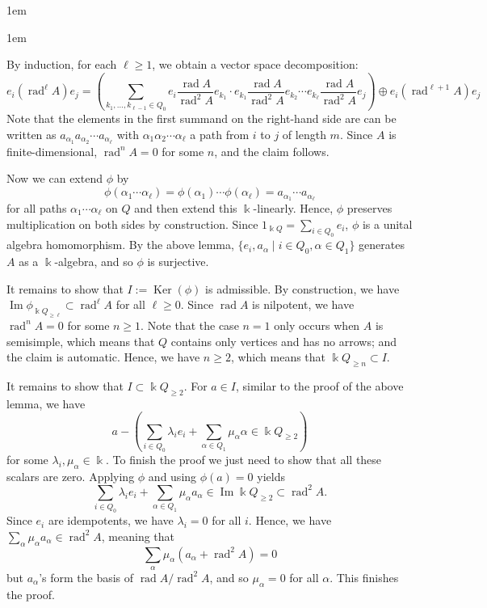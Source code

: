 \documentclass[11pt,a4paper]{article}
\makeatletter
\numberwithin{equation}{section}
\renewenvironment{proof}[1][\proofname]{\par
    \pushQED{\qed}%
    \normalfont \topsep0\p@\@plus6\p@ \labelsep1em\relax
    \trivlist
    \item[\hskip\labelsep\indent
        \bfseries #1]\ignorespaces
    \mbox{}
}{
    \popQED\endtrivlist\@endpefalse
}
\theoremstyle{all}
\theoremstyle{remark}
\newcommand{\rad}{\operatorname{rad}\nolimits}
\renewcommand{\Im}{\operatorname{Im}\nolimits}
\newcommand{\Ker}{\operatorname{Ker}\nolimits}
\makeatother
\begin{document}
\begin{proof}
\begin{proof}
By induction, for each $\ell \ge 1$, we obtain a vector space decomposition:
\[
e_i (\rad^{\ell} A) e_j = \left( \sum_{k_1,\ldots, k_{\ell-1}\in Q_0} e_i \frac{\rad A}{\rad^2 A} e_{k_1} \cdot e_{k_1} \frac{\rad A}{\rad^2 A} e_{k_2} \cdots e_{k_\ell} \frac{\rad A}{\rad^2 A} e_j \right) \oplus e_i (\rad^{\ell+1} A) e_j
\]
Note that the elements in the first summand on the right-hand side are can be written as $a_{\alpha_1}a_{\alpha_2}\cdots a_{\alpha_\ell}$ with $\alpha_1\alpha_2\cdots \alpha_\ell$ a path from $i$ to $j$ of length $m$.
Since $A$ is finite-dimensional, $\rad^n A=0$ for some $n$, and the claim follows.
\end{proof}

Now we can extend $\phi$ by \[
\phi(\alpha_1\cdots \alpha_\ell) = \phi(\alpha_1)\cdots \phi(\alpha_\ell) = a_{\alpha_1} \cdots a_{\alpha_\ell}
\]
for all paths $\alpha_1\cdots \alpha_\ell$ on $Q$ and then extend this $\Bbbk$-linearly.
Hence, $\phi$ preserves multiplication on both sides by construction.
Since $1_{\Bbbk Q} = \sum_{i\in Q_0} e_i$, $\phi$ is a unital algebra homomorphism.
By the above lemma, $\{ e_i, a_\alpha \mid i\in Q_0, \alpha\in Q_1\}$ generates $A$ as a $\Bbbk$-algebra, and so $\phi$ is surjective.

It remains to show that $I:=\Ker(\phi)$ is admissible.
By construction, we have $\Im\phi_{\Bbbk Q_{\ge\ell}}\subset \rad^\ell A$ for all $\ell\ge 0$.
Since $\rad A$ is nilpotent, we have $\rad^n A=0$ for some $n\ge 1$.  Note that the case $n=1$ only occurs when $A$ is semisimple, which means that $Q$ contains only vertices and has no arrows; and the claim is automatic.
Hence, we have $n\ge 2$, which means that $\Bbbk Q_{\ge n}\subset I$.

It remains to show that $I\subset \Bbbk Q_{\ge 2}$.
For $a\in I$, similar to the proof of the above lemma, we have
\[
a-\left( \sum_{i\in Q_0} \lambda_i e_i + \sum_{\alpha\in Q_1} \mu_\alpha \alpha \in \Bbbk Q_{\ge 2}\right)
\]
for some $\lambda_i, \mu_\alpha\in \Bbbk$.
To finish the proof we just need to show that all these scalars are zero.
Applying $\phi$ and using $\phi(a)=0$ yields
\[
\sum_{i\in Q_0} \lambda_i e_i + \sum_{\alpha\in Q_1} \mu_\alpha a_\alpha \in \Im \Bbbk Q_{\ge 2} \subset \rad^2 A.
\]
Since $e_i$ are idempotents, we have $\lambda_i=0$ for all $i$.
Hence, we have $\sum_{\alpha} \mu_\alpha a_\alpha \in \rad^2 A$, meaning that
\[
\sum_\alpha \mu_\alpha(a_\alpha + \rad^2 A) =0
\]
but $a_\alpha$'s form the basis of $\rad A/\rad^2A$, and so $\mu_\alpha=0$ for all $\alpha$.  This finishes the proof.
\end{proof}
\end{document}
